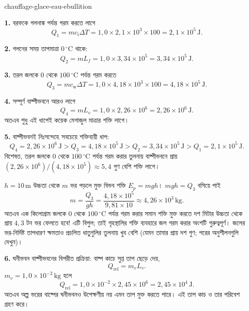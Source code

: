 \begin{exo}[ঠান্ডা বরফ থেকে ফুটন্ত জল: মাত্রার ক্রম]{chauffage-glace-eau-ebullition}
\begin{solution}
\textbf{1.} বরফকে গলনাঙ্ক পর্যন্ত গরম করতে লাগে
\[
Q_1=mc_{\mathrm{i}}\Delta T
=1{,}0\times2{,}1\times10^3\times100
=2{,}1\times10^5\,\text{J}.
\]

\textbf{2.} গলনের সময় তাপমাত্রা $0\,{}^\circ\text{C}$ থাকে:
\[
Q_2=mL_f=1{,}0\times3{,}34\times10^5=3{,}34\times10^5\,\text{J}.
\]

\textbf{3.} তরল জলকে $0$ থেকে $100\,{}^\circ\text{C}$ পর্যন্ত গরম করতে
\[
Q_3=mc_{\mathrm{w}}\Delta T
=1{,}0\times4{,}18\times10^3\times100
=4{,}18\times10^5\,\text{J}.
\]

\textbf{4.} সম্পূর্ণ বাষ্পীভবনে আরও লাগে
\[
Q_4=mL_v=1{,}0\times2{,}26\times10^6=2{,}26\times10^6\,\text{J}.
\]
অতএব শুধু এই ধাপেই কয়েক মেগাজুল মাত্রার শক্তি লাগে।

\textbf{5.} বাষ্পীভবনই নিঃসন্দেহে সবচেয়ে শক্তিব্যয়ী ধাপ:
\[
Q_4=2{,}26\times10^6\,\text{J}
>Q_3=4{,}18\times10^5\,\text{J}
>Q_2=3{,}34\times10^5\,\text{J}
>Q_1=2{,}1\times10^5\,\text{J}.
\]
বিশেষত, তরল জলকে $0$ থেকে $100\,{}^\circ\text{C}$ পর্যন্ত গরম করার তুলনায় বাষ্পীভবনে প্রায় $(2{,}26\times10^6)/(4{,}18\times10^5)\approx5{,}4$ গুণ বেশি শক্তি লাগে।

$h=10\,\text{m}$ উচ্চতা থেকে $m$ ভর পড়লে মুক্ত বিভব শক্তি $E_p=mgh$। $mgh=Q_3$ বসিয়ে পাই
\[
m=\frac{Q_3}{gh}
=\frac{4{,}18\times10^5}{9{,}81\times10}
\approx4{,}26\times10^3\,\text{kg}.
\]
অতএব এক কিলোগ্রাম জলকে $0$ থেকে $100\,{}^\circ\text{C}$ পর্যন্ত গরম করার সমান শক্তি মুক্ত করতে দশ মিটার উচ্চতা থেকে প্রায় $4{,}3$ টন ভর ফেলতে হবে! এটি বিপুল; তাই গৃহস্থালির শক্তি ব্যবহারে জল গরম করার অংশটি গুরুত্বপূর্ণ। জলের ভর-নির্দিষ্ট তাপধারণ ক্ষমতাও প্রচলিত ধাতুগুলির তুলনায় খুব বেশি (যেমন তামার প্রায় দশ গুণ; পরের অনুশীলনগুলি দেখুন)।

\textbf{6.} ঘনীভবন বাষ্পীভবনের বিপরীত প্রক্রিয়া: বাষ্প কাচে সুপ্ত তাপ ছেড়ে দেয়,
\[
Q_{\mathrm{rel}}=m_vL_v.
\]
$m_v=1{,}0\times10^{-2}\,\text{kg}$ হলে
\[
Q_{\mathrm{rel}}=1{,}0\times10^{-2}\times2{,}45\times10^6
=2{,}45\times10^4\,\text{J}.
\]
অতএব অল্প ভরের বাষ্পের ঘনীভবনও উপেক্ষণীয় নয় এমন তাপ মুক্ত করতে পারে। এই তাপ কাচ ও তার পরিবেশ গ্রহণ করে।
\end{solution}
\end{exo}

